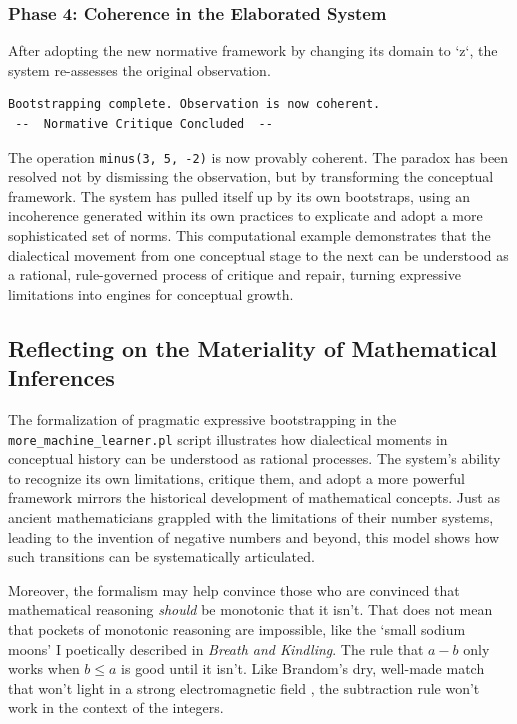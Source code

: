 \documentclass[12pt]{book}
\begin{document}
\subsubsection{Phase 4: Coherence in the Elaborated System}
After adopting the new normative framework by changing its domain to `z`, the system re-assesses the original observation.
\begin{verbatim}
Bootstrapping complete. Observation is now coherent.
 --  Normative Critique Concluded  -- 
\end{verbatim}
The operation \texttt{minus(3, 5, -2)} is now provably coherent. The paradox has been resolved not by dismissing the observation, but by transforming the conceptual framework. The system has pulled itself up by its own bootstraps, using an incoherence generated within its own practices to explicate and adopt a more sophisticated set of norms. This computational example demonstrates that the dialectical movement from one conceptual stage to the next can be understood as a rational, rule-governed process of critique and repair, turning expressive limitations into engines for conceptual growth.

\subsection{Reflecting on the Materiality of Mathematical Inferences}

The formalization of pragmatic expressive bootstrapping in the \texttt{more\_machine\_learner.pl} script illustrates how dialectical moments in conceptual history can be understood as rational processes. The system's ability to recognize its own limitations, critique them, and adopt a more powerful framework mirrors the historical development of mathematical concepts. Just as ancient mathematicians grappled with the limitations of their number systems, leading to the invention of negative numbers and beyond, this model shows how such transitions can be systematically articulated.

Moreover, the formalism may help convince those who are convinced that mathematical reasoning \textit{should} be monotonic that it isn't. That does not mean that pockets of monotonic reasoning are impossible, like the `small sodium moons' I poetically described in \textit{Breath and Kindling}. The rule that $a-b$ only works when $b \leq a$ is good until it isn't. Like Brandom's dry, well-made match that won't light in a strong electromagnetic field \parencite*[88]{Brandom2000}, the subtraction rule won't work in the context of the integers. 
\end{document}
